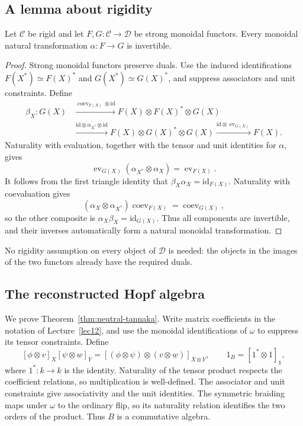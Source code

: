 \subsection*{A lemma about rigidity}
\begin{lemma}\label{lem:monoidal-natural-invertible}
Let $\mathcal C$ be rigid and let $F,G:\mathcal C\to\mathcal D$ be strong monoidal functors. Every monoidal natural transformation $\alpha:F\to G$ is invertible.
\end{lemma}
\begin{proof}
Strong monoidal functors preserve duals. Use the induced identifications $F(X^*)\simeq F(X)^*$ and $G(X^*)\simeq G(X)^*$, and suppress associators and unit constraints. Define
\[
\begin{split}
 \beta_X:G(X)&\xrightarrow{\operatorname{coev}_{F(X)}\otimes\mathrm{id}}
 F(X)\otimes F(X)^*\otimes G(X)\\
 &\xrightarrow{\mathrm{id}\otimes\alpha_{X^*}\otimes\mathrm{id}}
 F(X)\otimes G(X)^*\otimes G(X)
 \xrightarrow{\mathrm{id}\otimes\operatorname{ev}_{G(X)}}F(X).
\end{split}
\]
Naturality with evaluation, together with the tensor and unit identities for $\alpha$, gives
\[
 \operatorname{ev}_{G(X)}(\alpha_{X^*}\otimes\alpha_X)
 =\operatorname{ev}_{F(X)}.
\]
It follows from the first triangle identity that $\beta_X\alpha_X=\mathrm{id}_{F(X)}$. Naturality with coevaluation gives
\[
 (\alpha_X\otimes\alpha_{X^*})\operatorname{coev}_{F(X)}
 =\operatorname{coev}_{G(X)},
\]
so the other composite is $\alpha_X\beta_X=\mathrm{id}_{G(X)}$. Thus all components are invertible, and their inverses automatically form a natural monoidal transformation.
\end{proof}
No rigidity assumption on every object of $\mathcal D$ is needed: the objects in the images of the two functors already have the required duals.

\subsection*{The reconstructed Hopf algebra}
We prove Theorem~\ref{thm:neutral-tannaka}. Write matrix coefficients in the notation of Lecture~\ref{lec12}, and use the monoidal identifications of $\omega$ to suppress its tensor constraints. Define
\[
 [\phi\otimes v]_X[\psi\otimes w]_Y
 =[(\phi\otimes\psi)\otimes(v\otimes w)]_{X\otimes Y},
 \qquad 1_B=[1^*\otimes1]_{\mathbb{1}},
\]
where $1^*:k\to k$ is the identity. Naturality of the tensor product respects the coefficient relations, so multiplication is well-defined. The associator and unit constraints give associativity and the unit identities. The symmetric braiding maps under $\omega$ to the ordinary flip, so its naturality relation identifies the two orders of the product. Thus $B$ is a commutative algebra.

